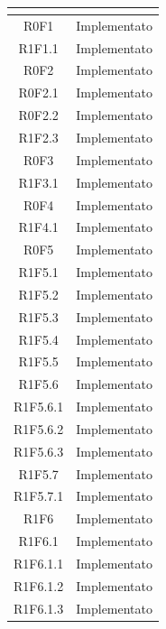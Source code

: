 \appendix
{}
\normalsize
\renewcommand{\arraystretch}{1.5}
\begin{longtable}{|c|c|}
	\hline
	\rowcolor{title_row}
	\textbf{\color{title_text}{Requisito}} & \textbf{\color{title_text}{Stato}} \\
	\hline
	\endhead
	{R0F1} & Implementato\\
	\hline
	{R1F1.1} & Implementato\\
	\hline
	{R0F2} & Implementato\\
	\hline
	{R0F2.1} & Implementato\\
	\hline
	{R0F2.2} & Implementato\\
	\hline
	{R1F2.3} & Implementato\\
	\hline
	{R0F3} & Implementato\\
	\hline
	{R1F3.1} & Implementato\\
	\hline
	{R0F4} & Implementato\\
	\hline
	{R1F4.1} & Implementato\\
	\hline
	{R0F5} & Implementato\\
	\hline
	{R1F5.1} & Implementato\\
	\hline
	{R1F5.2} & Implementato\\
	\hline
	{R1F5.3} & Implementato\\
	\hline
	{R1F5.4} & Implementato\\
	\hline
	{R1F5.5} & Implementato\\
	\hline
	{R1F5.6} & Implementato\\
	\hline
	{R1F5.6.1} & Implementato\\
	\hline
	{R1F5.6.2} & Implementato\\
	\hline
	{R1F5.6.3} & Implementato\\
	\hline
	{R1F5.7} & Implementato\\
	\hline
	{R1F5.7.1} & Implementato\\
	\hline
	{R1F6} & Implementato\\
	\hline
	{R1F6.1} & Implementato\\
	\hline
	{R1F6.1.1} & Implementato\\
	\hline
	{R1F6.1.2} & Implementato\\
	\hline
	{R1F6.1.3} & Implementato\\

\end{longtable}
